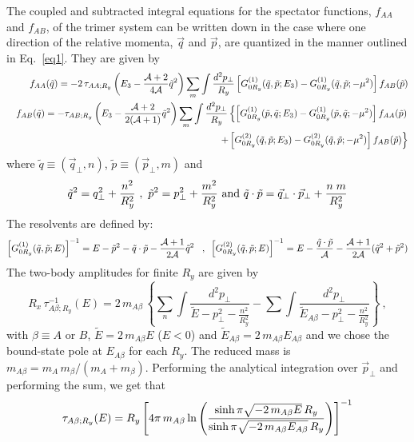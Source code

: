 \documentclass[twocolumn,showpacs,aps,prl,10pt]{revtex4}
\begin{document}
The coupled and subtracted integral equations for the 
spectator functions, $f_{AA}$ and $f_{AB}$, of the trimer system can be 
written down in the case 
where one direction of the relative 
momenta, $\vec q$ and $\vec p$, are quantized in the manner 
outlined in Eq.~\eqref{eq1}. They
are given by 
\begin{eqnarray}
\nonumber
&&f_{AA}(\tilde q)=-2\,\tau_{AA;R_y}\left(E_3-\frac{{\cal A}+2}{4{\cal A}} \tilde q^2\right) 
\sum_m\int\frac{d^2p_\perp}{R_y} 
\left[G^{(1)}_{0R_y}(\tilde q,\tilde p;E_3)-G^{(1)}_{0R_y}(\tilde q,\tilde p;-\mu^2)\right] f_{AB}(\tilde p)\\ \nonumber
&&f_{AB}(\tilde q)=-\tau_{AB;R_y}\left(E_3-\frac{{\cal A}+2}{2({\cal A}+1)}  \tilde q^2 \right) 
\sum_m\int \frac{d^2p_\perp}{R_y} \left\{
\left[G^{(1)}_{0R_y}(\tilde p,\tilde q;E_3)-G^{(1)}_{0R_y}(\tilde p,\tilde q;-\mu^2)\right] f_{AA}(\tilde p)
\right. \\ 
&&\left.+ \left[G^{(2)}_{0R_y}(\tilde q,\tilde p;E_3)-G^{(2)}_{0R_y}(\tilde q,\tilde p;-\mu^2)\right] f_{AB}(\tilde p)\right\}
\label{zre5a}
\end{eqnarray}
where  $\tilde q\equiv (\vec q_\perp,n)$, $\tilde p\equiv (\vec p_\perp,m)$ and 
\begin{equation}
\nonumber
\tilde q^2=q_\perp^2+{n^2\over R_y^2}\,\, ,\,\, \tilde p^2=p_\perp^2+{m^2\over R_y^2} \,\, {\rm and} \,\,  
\tilde q\cdot \tilde p=\vec q_\perp\cdot \vec p_\perp +\frac{n\;m}{R_y^2}
\end{equation}
The resolvents are defined by:
\begin{equation}
\left[G^{(1)}_{0R_y}(\tilde q,\tilde p;E)\right]^{-1}=
E-\tilde p^2-\tilde q\cdot \tilde p-\frac{{\cal A}+1}{2{\cal A}}\tilde q^2 
 \,\,\,\,\, , \,\,\,
\left[G^{(2)}_{0R_y}(\tilde q,\tilde p;E)\right]^{-1}= E
-\frac{\tilde q\cdot \tilde p}{{\cal A}}-\frac{{\cal A}+1}{2{\cal A}}(\tilde q^2+\tilde p^2)
\label{greenq2d}
\end{equation}
The two-body amplitudes for finite $R_y$ are given by
\begin{equation}
R_x \,\tau^{-1}_{A\beta;R_y}(E)
 =2\,m_{A\beta}\,\left\{\sum_n\int  
\frac{d^2p_\perp}{ \tilde E-
p_\perp^2-\frac{n^2}{R_y^2}}
-\sum\int  
\frac{d^2p_\perp}{\tilde E_{A\beta}-
p_\perp^2-\frac{n^2}{R_y^2}} \right\}
\ , \label{rtauab}
\end{equation}
with $\beta\equiv A$ or $ B$, $\tilde E=2\,m_{A\beta} E$ ($E<0$) and $\tilde E_{A\beta}=2\,m_{A\beta} E_{A\beta}$ 
and we chose the bound-state pole at $E_{A\beta}$ for each $R_y$. The reduced mass is $m_{A\beta}=m_A\, m_\beta/(m_A+ m_\beta)$.
Performing the analytical integration over $\vec p_\perp$ and performing the sum, we get that
\begin{eqnarray}
\tau_{A\beta;R_y}(E)=R_y\left[
4\pi\,m_{A\beta}\ln\left({\sinh\pi\sqrt{-2\,m_{A\beta}E}\,R_y\over\sinh\pi\sqrt{-2\,m_{A\beta}E_{A\beta}}\,R_y}\right)\right]^{-1}
\label{tauq3d}\end{eqnarray}
\end{document}
